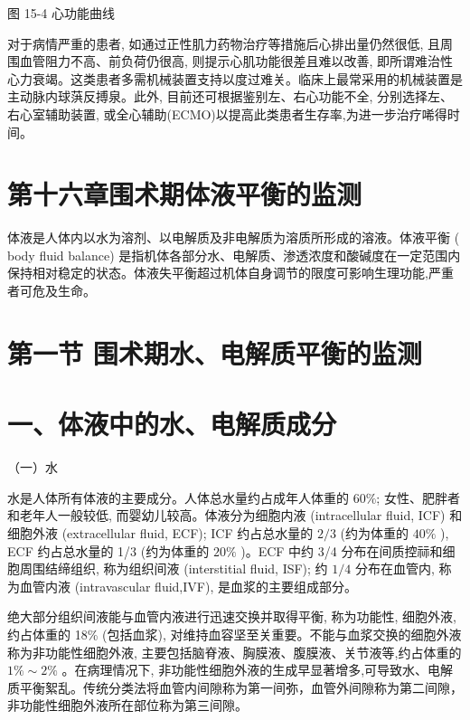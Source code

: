 \documentclass[10pt]{article}
\begin{document}
图 15-4 心功能曲线

对于病情严重的患者, 如通过正性肌力药物治疗等措施后心排出量仍然很低, 且周围血管阻力不高、前负荷仍很高, 则提示心肌功能很差且难以改善, 即所谓难治性心力衰竭。这类患者多需机械装置支持以度过难关。临床上最常采用的机械装置是主动脉内球葓反搏泉。此外, 目前还可根据鉴别左、右心功能不全, 分别选择左、右心室辅助装置, 或全心辅助(ECMO)以提高此类患者生存率,为进一步治疗唏得时间。

\section*{第十六章围术期体液平衡的监测}
体液是人体内以水为溶剂、以电解质及非电解质为溶质所形成的溶液。体液平衡 ( body fluid balance) 是指机体各部分水、电解质、渗透浓度和酸碱度在一定范围内保持相对稳定的状态。体液失平衡超过机体自身调节的限度可影响生理功能,严重者可危及生命。

\section*{第一节 围术期水、电解质平衡的监测}
\section*{一、体液中的水、电解质成分}
（一）水

水是人体所有体液的主要成分。人体总水量约占成年人体重的 $60 \%$; 女性、肥胖者和老年人一般较低, 而婴幼儿较高。体液分为细胞内液 (intracellular fluid, ICF) 和细胞外液 (extracellular fluid, ECF); ICF 约占总水量的 $2 / 3$ (约为体重的 $40 \%$ ), ECF 约占总水量的 1/3 (约为体重的 $20 \%$ )。ECF 中约 3/4 分布在间质控祘和细胞周围结缔组织, 称为组织间液 (interstitial fluid, ISF); 约 $1 / 4$ 分布在血管内, 称为血管内液 (intravascular fluid,IVF), 是血浆的主要组成部分。

绝大部分组织间液能与血管内液进行迅速交换并取得平衡, 称为功能性, 细胞外液, 约占体重的 18\% (包括血浆), 对维持血容坚至关重要。不能与血浆交换的细胞外液称为非功能性细胞外液, 主要包括脑脊液、胸膜液、腹膜液、关节液等,约占体重的 $1 \% \sim 2 \%$ 。在病理情况下, 非功能性细胞外液的生成早显著增多,可导致水、电解质平衡絮乱。传统分类法将血管内间隙称为第一间弥，血管外间隙称为第二间隙，非功能性细胞外液所在部位称为第三间隙。
\end{document}
